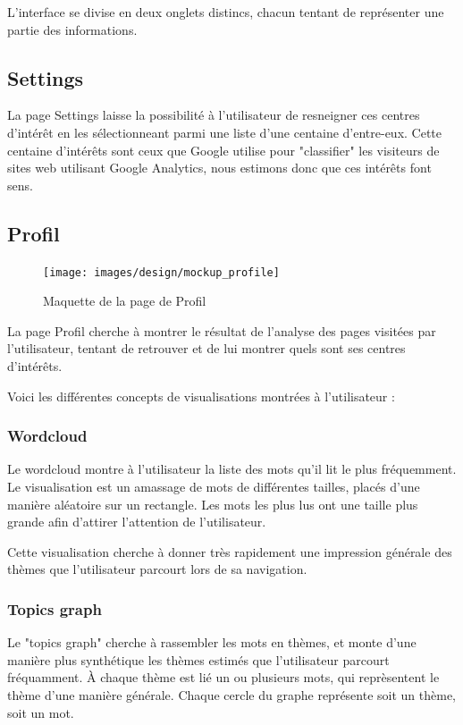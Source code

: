 	L'interface se divise en deux onglets distincs, chacun tentant de représenter une partie des informations. 

	\subsection{Settings}

		La page Settings laisse la possibilité à l'utilisateur de resneigner ces centres d'intérêt en les sélectionneant parmi une liste d'une centaine d'entre-eux. Cette centaine d'intérêts sont ceux que Google utilise pour "classifier" les visiteurs de sites web utilisant Google Analytics, nous estimons donc que ces intérêts font sens. 

	\subsection{Profil}

		\begin{figure}[!h]
			\centering
			\texttt{[image: images/design/mockup\_profile]}
			\caption{Maquette de la page de Profil}
			\label{d-mockup-profile}
		\end{figure}

		La page Profil cherche à montrer le résultat de l'analyse des pages visitées par l'utilisateur, tentant de retrouver et de lui montrer quels sont ses centres d'intérêts. 

		Voici les différentes concepts de visualisations montrées à l'utilisateur :

		\subsubsection{Wordcloud}

			Le wordcloud montre à l'utilisateur la liste des mots qu'il lit le plus fréquemment. Le visualisation est un amassage de mots de différentes tailles, placés d'une manière aléatoire sur un rectangle. Les mots les plus lus ont une taille plus grande afin d'attirer l'attention de l'utilisateur.

			Cette visualisation cherche à donner très rapidement une impression générale des thèmes que l'utilisateur parcourt lors de sa navigation.

		\subsubsection{Topics graph}

			Le "topics graph" cherche à rassembler les mots en thèmes, et monte d'une manière plus synthétique les thèmes estimés que l'utilisateur parcourt fréquamment. À chaque thème est lié un ou plusieurs mots, qui reprèsentent le thème d'une manière générale. Chaque cercle du graphe représente soit un thème, soit un mot.

